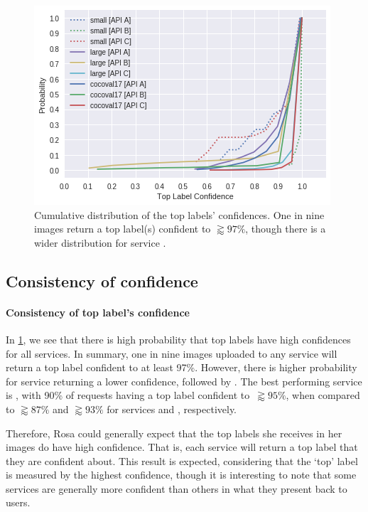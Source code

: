 \begin{figure}[p]
  \centering
  \includegraphics[width=0.75\linewidth]{topconfidence-cdf}
  \caption[Cumulative distribution of top label confidences]{Cumulative distribution of the top labels' confidences. One in nine images return a top label(s) confident to $\gtrapprox97\%$, though there is a wider distribution for service \googleapi{}.}  
  \label{icsme2019:fig:topconfidence-cdf}
\end{figure}

\subsection{Consistency of confidence}

\paragraph{Consistency of top label's confidence}

In \cref{icsme2019:fig:topconfidence-cdf}, we see that there is high probability that top labels have high confidences for all services. In summary, one in nine images uploaded to any service will return a top label confident to at least 97\%. However, there is higher probability for service \googleapi{} returning a lower confidence, followed by \azureapi{}. The best performing service is \awsapi{}, with 90\% of requests having a top label confident to~$\gtrapprox95\%$, when compared to $\gtrapprox87\%$ and $\gtrapprox93\%$ for services \googleapi{} and \azureapi{}, respectively.

Therefore, Rosa could generally expect that the top labels she receives in her images do have high confidence. That is, each service will return a top label that they are confident about. This result is expected, considering that the `top' label is measured by the highest confidence, though it is interesting to note that some services are generally more confident than others in what they present back to users.

